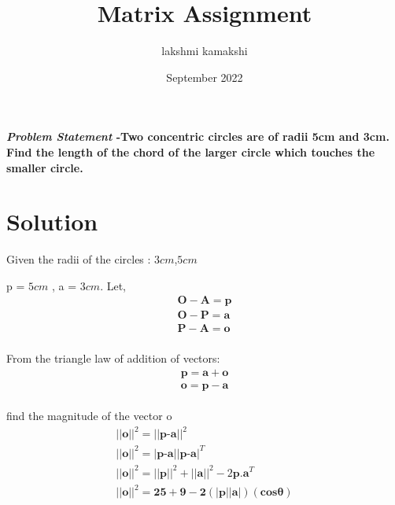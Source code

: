 \documentclass[journal,10pt,twocolumn]{article}
\title{\textbf{Matrix Assignment}}
\author{lakshmi kamakshi}
\date{September 2022}
\begin{document}
\maketitle
\paragraph{\textit{Problem Statement} -Two concentric circles are of radii 5cm and 3cm. Find the length of the chord of the larger circle which touches the smaller circle.}
\vspace{5mm}

\section*{Solution}

Given the radii of the circles : $3cm$,$5cm$

 p = $5cm$ , a = $3cm$.
Let,
\begin{eqnarray}
	\boldsymbol{O}-\boldsymbol{A} = \boldsymbol{p}
\\	\boldsymbol{O}-\boldsymbol{P} = \boldsymbol{a}
\\	\boldsymbol{P}-\boldsymbol{A} = \boldsymbol{o}
\end{eqnarray}
\\ From the triangle law of addition of vectors:
\begin{eqnarray}
 \boldsymbol{p} = \boldsymbol{a} + \boldsymbol{o}
\\ \boldsymbol{o} = \boldsymbol{p} - \boldsymbol{a}
\end{eqnarray}
\\ find the magnitude of the vector o 
	\begin{eqnarray}
		||\textbf{o}||^2 = ||\textbf{p-a}||^2
		\\	||\textbf{o}||^2 = |\textbf{p-a}||\textbf{p-a}|^T
		\\||\textbf{o}||^2 = ||\textbf{p}||^2+||\textbf{a}||^2-2\textbf{p.a}^T
		\\ ||\boldsymbol{o}||^2 = \boldsymbol{25 + 9 -2(|\textbf{p}||\textbf{a}|)(cos\theta)}
\end{eqnarray}
\end{document}
